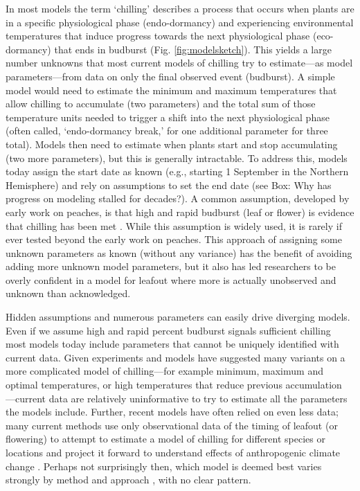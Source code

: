 \documentclass[11pt]{article}
\begin{document}
In most models the term `chilling' describes a process that occurs when plants are in a specific physiological phase (endo-dormancy) and experiencing environmental temperatures that induce progress towards the next physiological phase (eco-dormancy) that ends in budburst (Fig. \ref{fig:modelsketch}). This yields a large number unknowns that most current models of chilling try to estimate---as model parameters---from data on only the final observed event (budburst). A simple model would need to estimate the minimum and maximum temperatures that allow chilling to accumulate (two parameters) and the total sum of those temperature units needed to trigger a shift into the next physiological phase (often called, `endo-dormancy break,' for one additional parameter for three total). Models then need to estimate  when plants start and stop accumulating (two more parameters), but this is generally intractable. To address this, models today assign the start date as known (e.g., starting 1 September in the Northern Hemisphere) and rely on assumptions to set the end date (see Box: Why has progress on modeling stalled for decades?). A common assumption, developed by early work on peaches, is that high and rapid budburst (leaf or flower) is evidence that chilling has been met \citep{erez1971}. While this assumption is widely used, it is rarely if ever tested beyond the early work on peaches. This approach of assigning some unknown parameters as known (without any variance) has the benefit of avoiding adding more unknown model parameters, but it also has led researchers to be overly confident in a model for leafout where more is actually unobserved and unknown than acknowledged. 

Hidden assumptions and numerous parameters can easily drive diverging models. Even if we assume high and rapid percent budburst signals sufficient chilling most models today include parameters that cannot be uniquely identified with current data.  Given experiments and models have suggested many variants on a more complicated model of chilling---for example minimum, maximum and optimal temperatures, or high temperatures that reduce previous accumulation \citep[Fig. \ref{fig:modelsketch},][]{lued2011,luedeling2012chilling,chuine2016}---current data are relatively uninformative to try to estimate all the parameters the models include. Further, recent models have often relied on even less data; many current methods use only observational data of the timing of leafout (or flowering) to attempt to estimate a model of chilling for different species or locations and project it forward to understand effects of anthropogenic climate change \citep{lued2011,luedeling2012chilling,gao2024}. Perhaps not surprisingly then, which model is deemed best varies strongly by method and approach \citep{Caffarra:2011qf,basler2016evaluating,hufkens2018integrated}, with no clear pattern. 
\end{document}
